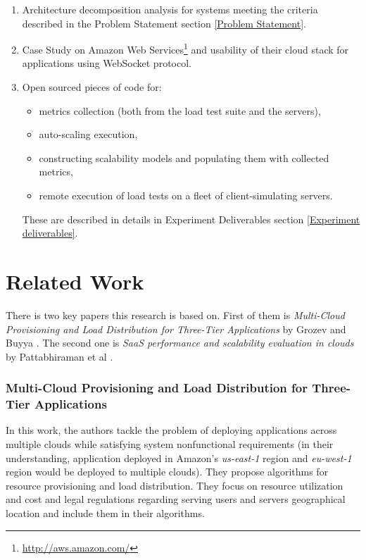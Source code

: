 \documentclass{uvamscse}
\begin{document}
\begin{enumerate}
  \item Architecture decomposition analysis for systems meeting the criteria described in the Problem Statement section \ref{Problem Statement}.
  \item Case Study on Amazon Web Services\footnote{\url{http://aws.amazon.com/}} and usability of their cloud stack for applications using WebSocket protocol.
  \item Open sourced pieces of code for:
  \begin{itemize}
    \item metrics collection (both from the load test suite and the servers),
    \item auto-scaling execution,
    \item constructing scalability models and populating them with collected metrics,
    \item remote execution of load tests on a fleet of client-simulating servers.
  \end{itemize}
  These are described in details in Experiment Deliverables section \ref{Experiment deliverables}.
\end{enumerate}

\section{Related Work}\label{Related Work}

There is two key papers this research is based on. First of them is \textit{Multi-Cloud Provisioning and Load Distribution for Three-Tier Applications} by Grozev and Buyya \cite{GroBuy}. The second one is \textit{SaaS performance and scalability evaluation in clouds} by Pattabhiraman et al \cite{Models}.

\subsubsection{Multi-Cloud Provisioning and Load Distribution for Three-Tier Applications}

In this work, the authors tackle the problem of deploying applications across multiple clouds while satisfying system nonfunctional requirements (in their understanding, application deployed in Amazon's \textit{us-east-1} region and \textit{eu-west-1} region would be deployed to multiple clouds). They propose algorithms for resource provisioning and load distribution. They focus on resource utilization and cost and legal regulations regarding serving users and servers geographical location and include them in their algorithms.
\end{document}
